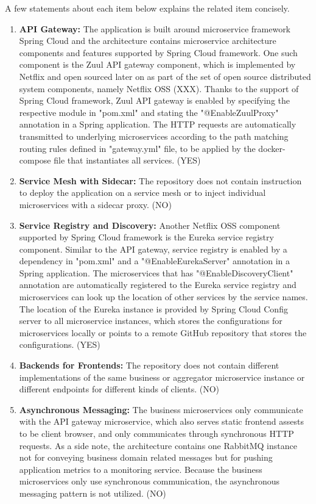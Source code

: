 \documentclass{Configuration_Files/PoliMi3i_thesis}
\begin{document}
A few statements about each item below explains the related item concisely.

\begin{enumerate}
    \item \textbf{API Gateway:} The application is built around microservice framework Spring Cloud and the architecture contains microservice architecture components and features supported by Spring Cloud framework. 
    One such component is the Zuul API gateway component, which is implemented by Netflix and open sourced later on as part of the set of open source distributed system components, namely  Netflix OSS (XXX).
    Thanks to the support of Spring Cloud framework, Zuul API gateway is enabled by specifying the respective module in "pom.xml" and stating the "@EnableZuulProxy" annotation in a Spring application.
    The HTTP requests are automatically transmitted to underlying microservices according to the path matching routing rules defined in "gateway.yml" file, to be applied by the docker-compose file that instantiates all services. (YES)
    
    \item \textbf{Service Mesh with Sidecar:} The repository does not contain instruction to deploy the application on a service mesh or to inject individual microservices with a sidecar proxy. (NO)
    
    \item \textbf{Service Registry and Discovery:} Another Netflix OSS component supported by Spring Cloud framework is the Eureka service registry component.
    Similar to the API gateway, service registry is enabled by a dependency in "pom.xml" and a "@EnableEurekaServer" annotation in a Spring application.
    The microservices that has "@EnableDiscoveryClient" annotation are automatically registered to the Eureka service registry and microservices can look up the location of other services by the service names.
    The location of the Eureka instance is provided by Spring Cloud Config server to all microservice instances, which stores the configurations for microservices locally or points to a remote GitHub repository that stores the configurations. (YES)
    
    \item \textbf{Backends for Frontends:} The repository does not contain different implementations of the same business or aggregator microservice instance or different endpoints for different kinds of clients. (NO)
    
    \item \textbf{Asynchronous Messaging:} The business microservices only communicate with the API gateway microservice, which also serves static frontend assests to be client browser, and only communicates through synchronous HTTP requests.
    As a side note, the architecture contains one RabbitMQ instance not for conveying business domain related messages but for pushing application metrics to a monitoring service.
    Because the business microservices only use synchronous communication, the asynchronous messaging pattern is not utilized. (NO)
    

\end{enumerate}
\end{document}
